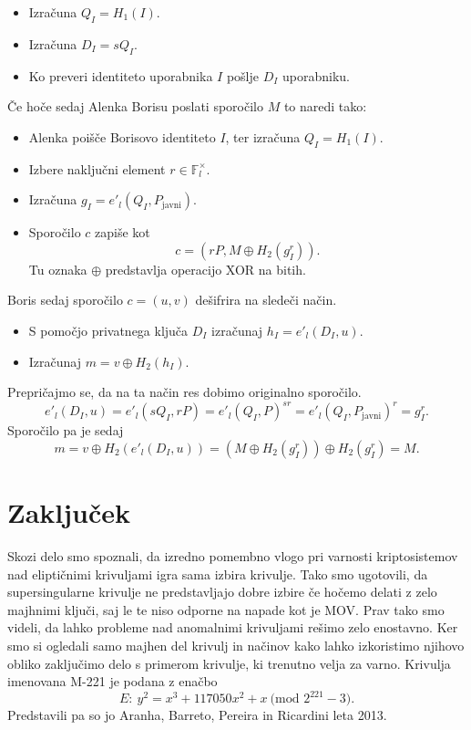 \documentclass[12pt,a4paper,twoside]{article}
\theoremstyle{definition} %
\theoremstyle{plain} %
\numberwithin{equation}{section}  %
\newcommand{\F}{\mathbb F}
\newcommand{\MOD}[1]{\ \text{(mod }{#1}\text{)}}
\begin{document}
\begin{itemize}
\item Izračuna $Q_I = H_1(I)$.
\item Izračuna $D_I = sQ_I$.
\item Ko preveri identiteto uporabnika $I$ pošlje $D_I$ uporabniku.
\end{itemize}

Če hoče sedaj Alenka Borisu poslati sporočilo $M$ to naredi tako:

\begin{itemize}
\item Alenka poišče Borisovo identiteto $I$, ter izračuna $Q_I = H_1(I)$.
\item Izbere naključni element $r \in \F^{\times}_l$.
\item Izračuna $g_I = e'_l(Q_I,P_{\text{javni}})$.
\item Sporočilo $c$ zapiše kot
$$c = (rP,M \oplus H_2(g^r_I)).$$
Tu oznaka $\oplus$ predstavlja operacijo XOR na bitih.
\end{itemize}

Boris sedaj sporočilo $c = (u,v)$ dešifrira na sledeči način.
\begin{itemize}
\item S pomočjo privatnega ključa $D_I$ izračunaj $h_I = e'_l(D_I,u)$.
\item Izračunaj $m= v \oplus H_2(h_I)$.
\end{itemize}

Prepričajmo se, da na ta način res dobimo originalno sporočilo.
$$e'_l(D_I,u) = e'_l(sQ_I,rP) = e'_l(Q_I,P)^{sr}= e'_l(Q_I,P_{\text{javni}})^r = g^r_I.$$
Sporočilo pa je sedaj
$$m = v \oplus H_2(e'_l(D_I,u)) = (M \oplus H_2(g^r_I)) \oplus H_2(g^r_I) = M.$$


\newpage

\section{Zaključek}

Skozi delo smo spoznali, da izredno pomembno vlogo pri varnosti kriptosistemov nad eliptičnimi krivuljami igra sama izbira krivulje. Tako smo ugotovili, da supersingularne krivulje ne predstavljajo dobre izbire če hočemo delati z zelo majhnimi ključi, saj le te niso odporne na napade kot je MOV. Prav tako smo videli, da lahko probleme nad anomalnimi krivuljami rešimo zelo enostavno. Ker smo si ogledali samo majhen del krivulj in načinov kako lahko izkoristimo njihovo obliko zaključimo delo s primerom krivulje, ki trenutno velja za varno. Krivulja imenovana M-221 je podana z enačbo
$$E:\ y^2 = x^3+117050x^2+x \MOD{2^{221} - 3}.$$
Predstavili pa so jo Aranha, Barreto, Pereira in  Ricardini leta 2013.
\end{document}
